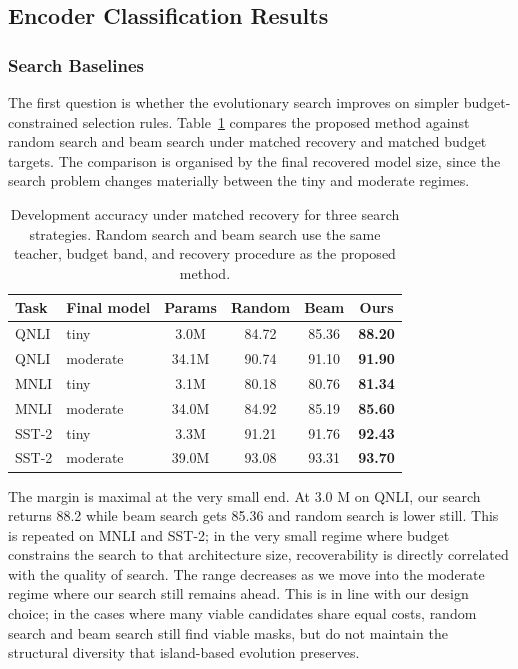 \subsection{Encoder Classification Results}
\label{subsec:encoder-results}

\subsubsection{Search Baselines}

The first question is whether the evolutionary search improves on simpler budget-constrained selection rules. Table~\ref{tab:search_baselines} compares the proposed method against random search and beam search under matched recovery and matched budget targets. The comparison is organised by the final recovered model size, since the search problem changes materially between the tiny and moderate regimes.

\begin{table}[H]
\centering
\scriptsize
\setlength{\tabcolsep}{4pt}
\renewcommand{\arraystretch}{1.08}
\caption{Development accuracy under matched recovery for three search strategies. Random search and beam search use the same teacher, budget band, and recovery procedure as the proposed method.}
\label{tab:search_baselines}
\begin{tabular}{llcccc}
\toprule
Task & Final model & Params & Random & Beam & Ours \\
\midrule
QNLI  & tiny      & 3.0M  & 84.72 & 85.36 & \textbf{88.20} \\
QNLI  & moderate  & 34.1M & 90.74 & 91.10 & \textbf{91.90} \\
MNLI  & tiny      & 3.1M  & 80.18 & 80.76 & \textbf{81.34} \\
MNLI  & moderate  & 34.0M & 84.92 & 85.19 & \textbf{85.60} \\
SST-2 & tiny      & 3.3M  & 91.21 & 91.76 & \textbf{92.43} \\
SST-2 & moderate  & 39.0M & 93.08 & 93.31 & \textbf{93.70} \\
\bottomrule
\end{tabular}
\end{table}

The margin is maximal at the very small end. At 3.0 M on QNLI, our search returns 88.2 while beam search gets 85.36 and random search is lower still. This is repeated on MNLI and SST-2; in the very small regime where budget constrains the search to that architecture size, recoverability is directly correlated with the quality of search. The range decreases as we move into the moderate regime where our search still remains ahead. This is in line with our design choice; in the cases where many viable candidates share equal costs, random search and beam search still find viable masks, but do not maintain the structural diversity that island-based evolution preserves.

